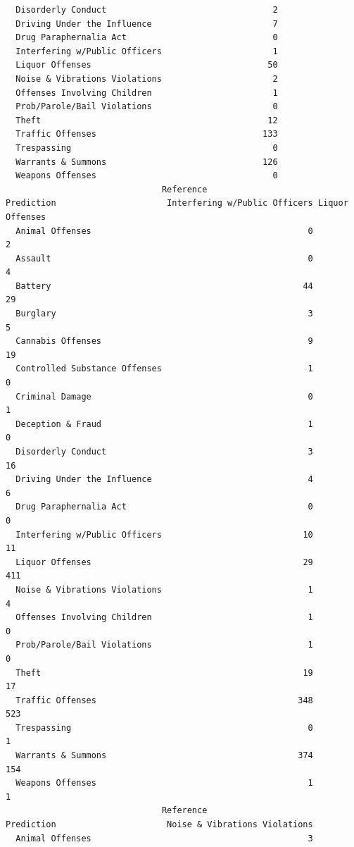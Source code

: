 \documentclass[
  article]{jss}
\begin{document}
\begin{verbatim}
  Disorderly Conduct                                 2
  Driving Under the Influence                        7
  Drug Paraphernalia Act                             0
  Interfering w/Public Officers                      1
  Liquor Offenses                                   50
  Noise & Vibrations Violations                      2
  Offenses Involving Children                        1
  Prob/Parole/Bail Violations                        0
  Theft                                             12
  Traffic Offenses                                 133
  Trespassing                                        0
  Warrants & Summons                               126
  Weapons Offenses                                   0
                               Reference
Prediction                      Interfering w/Public Officers Liquor Offenses
  Animal Offenses                                           0               2
  Assault                                                   0               4
  Battery                                                  44              29
  Burglary                                                  3               5
  Cannabis Offenses                                         9              19
  Controlled Substance Offenses                             1               0
  Criminal Damage                                           0               1
  Deception & Fraud                                         1               0
  Disorderly Conduct                                        3              16
  Driving Under the Influence                               4               6
  Drug Paraphernalia Act                                    0               0
  Interfering w/Public Officers                            10              11
  Liquor Offenses                                          29             411
  Noise & Vibrations Violations                             1               4
  Offenses Involving Children                               1               0
  Prob/Parole/Bail Violations                               1               0
  Theft                                                    19              17
  Traffic Offenses                                        348             523
  Trespassing                                               0               1
  Warrants & Summons                                      374             154
  Weapons Offenses                                          1               1
                               Reference
Prediction                      Noise & Vibrations Violations
  Animal Offenses                                           3

\end{verbatim}
\end{document}
